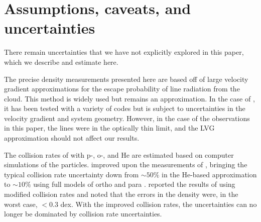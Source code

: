 % 
% 
% 

\section{Assumptions, caveats, and uncertainties}
There remain uncertainties that we have not explicitly explored in this paper,
which we describe and estimate here.

The precise density measurements presented here are based off of large velocity
gradient approximations \citep{Sobolev1957a} for the escape probability of line
radiation from the cloud.  This method is widely used but remains an
approximation.  In the case of \formaldehyde, it has been tested with a variety
of codes \cite{van-der-Tak2007a,Henkel1983a} but is subject to uncertainties in
the velocity gradient and system geometry.  However, in the case of the
observations in this paper, the lines were in the optically thin limit, and the
LVG approximation should not affect our results.

The collision rates of \formaldehyde with p-\hh, o-\hh, and He are estimated
based on computer simulations of the particles.  \citet{Troscompt2009a}
improved upon the measurements of \citet{Green1991a}, bringing the typical
collision rate uncertainty down from $\sim50\%$ in the He-based approximation
to $\sim10\%$ using full models of ortho and para \hh.  \citet{Zeiger2010a}
reported the results of using modified collision rates and noted that the
errors in the \hh density were, in the worst case, $<0.3$ dex.  With the
improved \citet{Troscompt2009a} collision rates, the uncertainties can no
longer be dominated by collision rate uncertainties.

